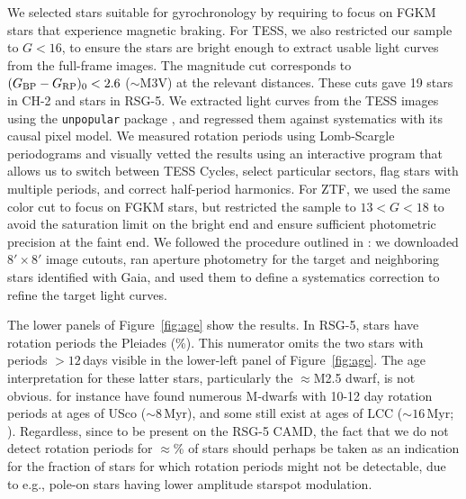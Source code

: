 \documentclass[12pt,twocolumn,tighten,linenumbers,trackchanges]{aastex63}
\newcommand{\bpmrpo}{(G_{\rm BP}-G_{\rm RP})_0}
\begin{document}
We selected stars suitable for gyrochronology by requiring 
\replaced{$\bpmrpo \geq 0.5$}{$\bpmrpo \geq 0.6$} to focus on FGKM stars that experience magnetic
braking.
For TESS, we also restricted our sample to $G<16$, to ensure the stars
are bright enough to extract usable light curves from the full-frame
images.  The magnitude cut corresponds to $\bpmrpo < 2.6$
($\sim$M3V) at the relevant distances.  These cuts gave 19 stars in
CH-2 and  stars in RSG-5.  We extracted light curves from the TESS
images using the \texttt{unpopular} package \citep{hattorio_2021_cpm},
and regressed them against systematics with its causal pixel model.
We measured rotation periods using Lomb-Scargle periodograms and
visually vetted the results using an interactive program that allows
us to switch between TESS Cycles, select particular sectors, flag
stars with multiple periods, and correct half-period harmonics. For
ZTF, we used the same color cut to focus on FGKM stars, but restricted
the sample to $13 < G < 18$ to avoid the saturation limit on the
bright end and ensure sufficient photometric precision at the faint
end. We followed the procedure outlined in \citet{curtis_rup147_2020}:
we downloaded $8'\times8'$ image cutouts, ran aperture photometry for
the target and neighboring stars identified with Gaia, and used them
to define a systematics correction to refine the target light curves. 

The lower panels of Figure~\ref{fig:age} show the results.  In RSG-5,
 stars have rotation periods  the Pleiades (\%).  This
numerator omits the two stars with periods $>$$12$\,days visible in
the lower-left panel of Figure~\ref{fig:age}.  The age interpretation
for these latter stars, particularly the $\approx$M2.5 dwarf, is not
obvious.  \citet{rebull_usco_2018} for instance have found numerous
M-dwarfs with 10-12 day rotation periods at ages of USco
($\sim$$8$\,Myr), and some  still exist at ages of
LCC ($\sim$$16$\,Myr; ).  Regardless, since
 to be present on the RSG-5 CAMD,
the fact
that we do not detect rotation periods for $\approx$\%
of stars should perhaps be taken as an indication for the fraction of
stars for which rotation periods might not be detectable, due to
{e.g.}, pole-on stars having lower amplitude starspot modulation.
\end{document}
